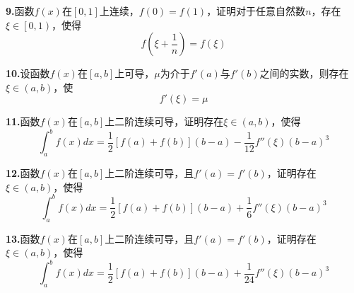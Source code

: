 \documentclass[10pt]{article}
\begin{document}
\textbf{9.}函数$f\left( x \right)$在$\left[ 0,1 \right]$上连续，$f\left( 0 \right) =f\left( 1 \right)$，证明对于任意自然数$n$，存在$\xi \in \left[ 0,1 \right)$，使得
$$
f\left( \xi +\frac{1}{n} \right) =f\left( \xi \right)
$$

\textbf{10.}设函数$f\left( x \right)$在$\left[ a,b \right]$上可导，$\mu$为介于$f'\left( a \right)$与$f'\left( b \right)$之间的实数，则存在$\xi \in \left( a,b \right)$，使
$$
f'\left( \xi \right) =\mu
$$

\textbf{11.}函数$f\left( x \right)$在$\left[ a,b \right]$上二阶连续可导，证明存在$\xi \in \left( a,b \right)$，使得
$$
\int_a^b{f\left( x \right) dx}=\frac{1}{2}\left[ f\left( a \right) +f\left( b \right) \right] \left( b-a \right) -\frac{1}{12}f''\left( \xi \right) \left( b-a \right) ^3
$$

\textbf{12.}函数$f\left( x \right)$在$\left[ a,b \right]$上二阶连续可导，且$f'\left( a \right) =f'\left( b \right)$，证明存在$\xi \in \left( a,b \right)$，使得
$$
\int_a^b{f\left( x \right) dx}=\frac{1}{2}\left[ f\left( a \right) +f\left( b \right) \right] \left( b-a \right) +\frac{1}{6}f''\left( \xi \right) \left( b-a \right) ^3
$$

\textbf{13.}函数$f\left( x \right)$在$\left[ a,b \right]$上二阶连续可导，且$f'\left( a \right) =f'\left( b \right)$，证明存在$\xi \in \left( a,b \right)$，使得
$$
\int_a^b{f\left( x \right) dx}=\frac{1}{2}\left[ f\left( a \right) +f\left( b \right) \right] \left( b-a \right) +\frac{1}{24}f''\left( \xi \right) \left( b-a \right) ^3
$$
\end{document}
